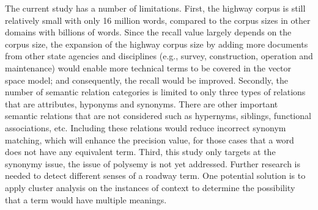\documentclass[Journal, BackFigs,NoLists, DoubleSpace]{ascelike}%
\begin{document}
\par
The current study has a number of limitations. First, the highway corpus is still relatively small with only 16 million words, compared to the corpus sizes in other domains with billions of words. Since the recall value largely depends on the corpus size, the expansion of the highway corpus size by adding more documents from other state agencies and disciplines (e.g., survey, construction, operation and maintenance) would enable more technical terms to be covered in the vector space model; and consequently, the recall would be improved. Secondly, the number of semantic relation categories is limited to only three types of relations that are attributes, hyponyms and synonyms. There are other important semantic relations that are not considered such as hypernyms, siblings, functional associations, etc. Including these relations would reduce incorrect synonym matching, which will enhance the precision value, for those cases that a word does not have any equivalent term. Third, this study only targets at the synonymy issue, the issue of polysemy is not yet addressed. Further research is needed to detect different senses of a roadway term. One potential solution is to apply cluster analysis on the instances of context to determine the possibility that a term would have multiple meanings. %
%
\end{document}

